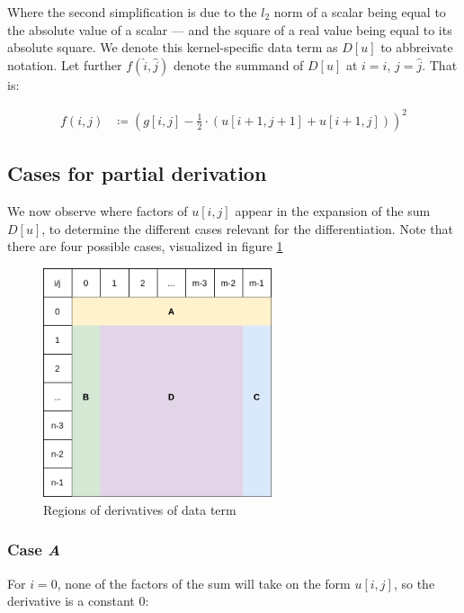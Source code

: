 \documentclass[a4paper]{scrreprt}
\begin{document}
Where the second simplification is due to the $l_2$ norm of a scalar being
equal to the absolute value of a scalar --- and the square of a real value
being equal to its absolute square. We denote this kernel-specific data term as
$D[u]$ to abbreivate notation. Let further $f(\hat{i}, \hat{j})$ denote the
summand of $D[u]$ at $i = \hat{i}$, $j = \hat{j}$. That is:

\begin{align*}
		f(i, j) & \coloneqq \left(g[i, j] - \frac{1}{2} \cdot (u[i + 1, j + 1] + u[i + 1, j])\right)^2
\end{align*}

\subsection{Cases for partial derivation}

We now observe where factors of $u[i, j]$ appear in the expansion of the sum
$D[u]$, to determine the different cases relevant for the differentiation. Note
that there are four possible cases, visualized in figure
\ref{fig:data_term_derivatives}

\begin{figure}
		\centering
		\includegraphics[width=0.6\textwidth]{resources/data_term_derivatives.png}
		\caption{Regions of derivatives of data term}
		\label{fig:data_term_derivatives}
\end{figure}


\subsubsection{Case \emph{A}}

For $i = 0$, none of the factors of the sum will take on the form $u[i, j]$, so
the derivative is a constant $0$:
\end{document}
